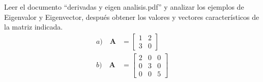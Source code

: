 \documentclass[12pt]{article}
\newenvironment{problem}[2][Problema]{\begin{trivlist}
\item[\hskip \labelsep {\bfseries #1}\hskip \labelsep {\bfseries #2.}]}{\end{trivlist}}
\begin{document}
\begin{problem}{9}
Leer el documento “derivadas y eigen analisis.pdf” y analizar los ejemplos de Eigenvalor y Eigenvector,
después obtener los valores y vectores característicos de la matriz indicada.
\begin{align*}
a)\quad \textbf{A} &=
\begin{bmatrix}
1&2 \\
3&0
\end{bmatrix} \\
b) \quad \textbf{A} &= 
\begin{bmatrix}
2 & 0 & 0\\
0 & 3 & 0 \\
0 & 0 & 5 
\end{bmatrix}
\end{align*}
\end{problem}
\end{document}
